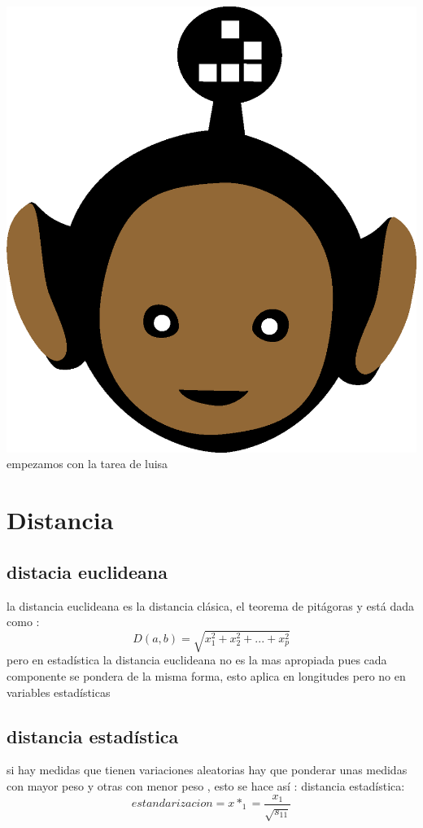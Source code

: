 \documentclass[10pt,a4paper]{article} %
\begin{document}
    \title{\rmfamily\normalfont{}}
    \author{}
    \date{\today} 
    
    \maketitle
     

    \includegraphics[width=0.1\linewidth]{negro_cara.png}
    empezamos con la tarea de luisa
    \section{Distancia}

        \subsection{distacia euclideana}
            la distancia euclideana es la distancia clásica, el teorema de
            pitágoras y está dada como :
            \begin{equation}
                D(a,b) = \sqrt{x _{1}^{2} + x_2 ^{2} + ... + x_p ^{2}    } 
            \end{equation}
            pero en estadística la distancia euclideana no es la mas apropiada
            pues cada componente se pondera de la misma forma, esto aplica en
            longitudes pero no en variables estadísticas

        \subsection{distancia estadística}
            si hay medidas que tienen variaciones aleatorias hay que ponderar
            unas medidas con mayor peso y otras con menor peso , esto se hace
            así : 
            distancia estadística:
            \begin{equation}
               estandarizacion  = x*_1 =  \frac{x_1}{\sqrt{s _{11} } }
            \end{equation}
            
\end{document}
